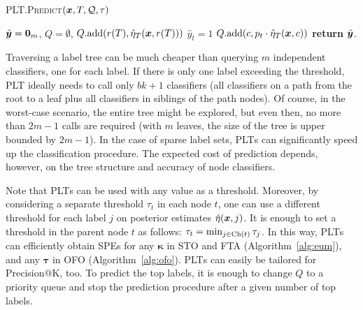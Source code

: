 \documentclass{article}
\newcommand{\btau}{\boldsymbol{\tau}}
\newcommand{\bkappa}{\boldsymbol{\kappa}}
\newcommand{\Algo}[1]{\textsc{#1}}
\begin{document}
\begin{algorithm}[t]
\caption{\Algo{PLT.Predict}$(\boldsymbol{x}, T, \mathcal{Q}, \tau)$}%
\label{alg:pt-prediction}
\begin{algorithmic}[1]
\State $\hat{\boldsymbol{y}} = \boldsymbol{0}_m$, $Q = \emptyset$, $Q.\mathrm{add}(r(T),\hat{\eta}_T(\boldsymbol{x},r(T)))$ 
\State $\hat{y}_t = 1$ 
\Else
{} 
\State $Q.\mathrm{add}(c, p_t \cdot \hat{\eta}_T(\boldsymbol{x},c))$ 
\EndFor
\EndIf
\EndIf
\EndWhile
\State \textbf{return} $\hat{\boldsymbol{y}}$. 
\end{algorithmic}
\end{algorithm} 


Traversing a label tree can be much cheaper than querying $m$ independent classifiers, one for each label. If there is only one label exceeding the threshold, \Algo{PLT} ideally needs to call only $bk+1$ classifiers (all classifiers on a path from the root to a leaf plus all classifiers in siblings of the path nodes). Of course, in the worst-case scenario, the entire tree might be explored, but even then, no more than $2m-1$ calls are required (with $m$ leaves, the size of the tree is upper bounded by $2m-1$). In the case of sparse label sets, \Algo{PLT}s can significantly speed up the classification procedure. The expected cost of prediction depends, however, on the tree structure and accuracy of node classifiers.


Note that \Algo{PLT}s can be used with any value as a threshold. Moreover, by considering a separate threshold $\tau_t$ in each node $t$, one can use a different threshold for each label $j$ on posterior estimates $\hat\eta(\boldsymbol{x},j)$. It is enough to set a threshold in the parent node $t$ as follows:
$\tau_t = \min_{j \in \mathrm{Ch}(t)} \tau_j$. 
In this way, \Algo{PLT}s  can efficiently obtain SPEs for any $\bkappa$ in \Algo{STO} and \Algo{FTA} (Algorithm~\ref{alg:eum}), and any $\btau$ in \Algo{OFO} (Algorithm~\ref{alg:ofo}). 
%
\Algo{PLT}s can easily be tailored for Precision@K, too. To predict the top labels, it is enough to change $Q$ to a priority queue and stop the prediction procedure after a given number of top labels. %
\end{document}

